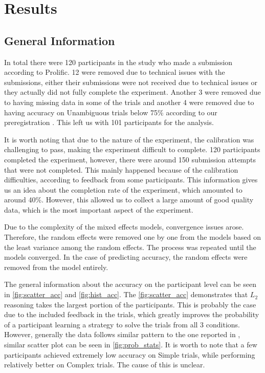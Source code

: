 \chapter{Results}
\label{chap:results}

\section{General Information}
\label{sec:general_info}
In total there were 120 participants in the study who made a submission according to Prolific. 12 were removed due to technical issues with the submissions, either their submissions were not received due to technical issues or they actually did not fully complete the experiment. Another 3 were removed due to having missing data in some of the trials and another 4 were removed due to having accuracy on Unambiguous trials below 75\% according to our preregistration \citep{preregistration}. This left us with 101 participants for the analysis. 

It is worth noting that due to the nature of the experiment, the calibration was challenging to pass, making the experiment difficult to complete. 120 participants completed the experiment, however, there were around 150 submission attempts that were not completed. This mainly happened because of the calibration difficulties, according to feedback from some participants. This information gives us an idea about the completion rate of the experiment, which amounted to around 40\%. However, this allowed us to collect a large amount of good quality data, which is the most important aspect of the experiment.

Due to the complexity of the mixed effects models, convergence issues arose. Therefore, the random effects were removed one by one from the models based on the least variance among the random effects. The process was repeated until the models converged. In the case of predicting accuracy, the random effects were removed from the model entirely. 

The general information about the accuracy on the participant level can be seen in \autoref{fig:scatter_acc} and \autoref{fig:hist_acc}. The \autoref{fig:scatter_acc} demonstrates that $L_2$ reasoning takes the largest portion of the participants. This is probably the case due to the included feedback in the trials, which greatly improves the probability of a participant learning a strategy to solve the trials from all 3 conditions. However, generally the data follows similar pattern to the one reported in \cite{Franke_2016}, similar scatter plot can be seen in \autoref{fig:prob_stats}. It is worth to note that a few participants achieved extremely low accuracy on Simple trials, while performing relatively better on Complex trials. The cause of this is unclear.

